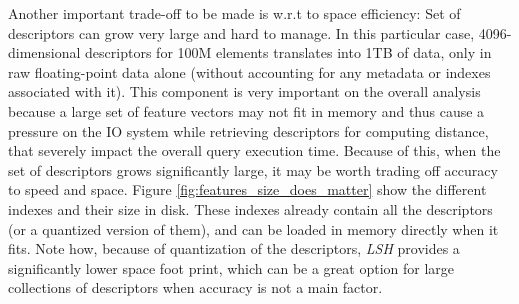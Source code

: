 Another important trade-off to be made is w.r.t to space efficiency: Set of
descriptors can grow very large and hard to manage.
In this particular case, 4096-dimensional descriptors for 100M elements
translates into 1TB of data, only in raw floating-point data alone (without
accounting for any metadata or indexes associated with it).
This component is very important on the overall analysis because a large set
of feature vectors may not fit in memory and thus cause a pressure on the IO
system while retrieving descriptors for computing distance, that severely impact
the overall query execution time.
Because of this, when the set of descriptors grows significantly large,
it may be worth trading off accuracy to speed and space.
Figure \ref{fig:features_size_does_matter} show the different indexes and
their size in disk. These indexes already contain all the descriptors (or
a quantized version of them), and can be loaded in memory directly when it fits.
Note how, because of quantization of the descriptors, \textit{LSH} provides a
significantly lower space foot print, which can be a great option for
large collections of descriptors when accuracy is not a main factor.
